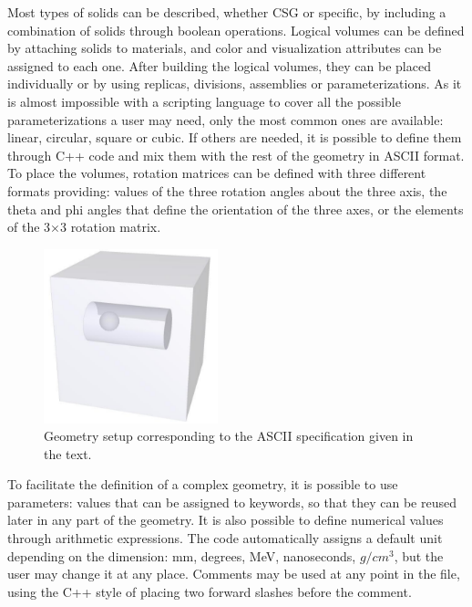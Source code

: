 
Most types of \Gfour{} solids can be described, whether CSG or specific, by
including a combination of solids through boolean operations.  Logical volumes
can be defined by attaching solids to materials, and color and visualization 
attributes can be assigned to each one.  After building the logical volumes, 
they can be placed individually or by using replicas, divisions, assemblies or
parameterizations.  As it is almost impossible with a scripting language to 
cover all the possible parameterizations a user may need, only the most common
ones are available: linear, circular, square or cubic.  If others are needed,
it is possible to define them through C++ code and mix them with the rest of
the geometry in ASCII format.  To place the volumes, rotation matrices can be
defined with three different formats providing: values of the three rotation 
angles about the three axis, the theta and phi angles that define the 
orientation of the three axes, or the elements of the 3$\times$3 rotation
matrix. 

\begin{figure}
    \includegraphics[width=0.45\textwidth]{figures/ascii_example.pdf}
\caption{Geometry setup corresponding to the ASCII specification given in the text.}
\label{ascii_example}
\end{figure}

To facilitate the definition of a complex geometry, it is possible to use
parameters: values that can be assigned to keywords, so that they can be reused
later in any part of the geometry.  It is also possible to define numerical 
values through arithmetic expressions.
The code automatically assigns a default unit depending on the dimension: mm,
degrees, MeV, nanoseconds, $g/cm^3$, but the user may change it at any place.
Comments may be used at any point in the file, using the C++ style of placing
two forward slashes before the comment.

